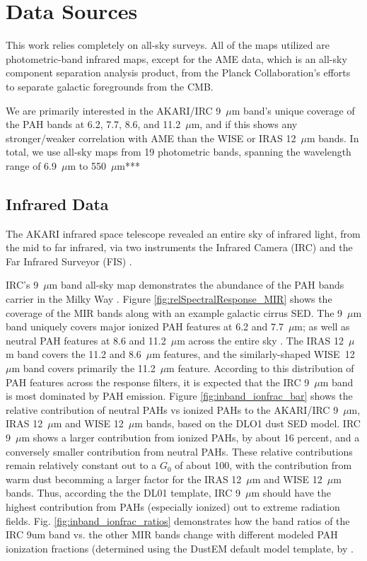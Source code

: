\chapter{Data Sources}
\label{sec:data}

This work relies completely on all-sky surveys. All of the maps utilized are photometric-band infrared maps, except for the AME data, which is an all-sky component separation analysis product, from the Planck Collaboration's efforts to separate galactic foregrounds from the CMB.

We are primarily interested in the AKARI/IRC 9~$\mu$m band's unique coverage of the PAH bands at 6.2, 7.7, 8.6, and 11.2~$\mu$m, and if this shows any stronger/weaker correlation with AME than the WISE or IRAS 12~$\mu$m bands. In total, we use all-sky maps from 19 photometric bands, spanning the wavelength range of 6.9~$\mu$m to 550~$\mu$m***

\section{Infrared Data}

     The AKARI infrared space telescope revealed an entire sky of infrared light, from the mid to far infrared, via two instruments \citep{akari07} the Infrared Camera (IRC)\citep{irc07} and the Far Infrared Surveyor (FIS) \citep{fis07}.

     IRC's 9~$\mu$m band all-sky map demonstrates the abundance of the PAH bands carrier in the Milky Way \citep{ishihara10}. Figure \ref{fig:relSpectralResponse_MIR} shows the coverage of the MIR bands along with an example galactic cirrus SED. The 9~$\mu$m band uniquely covers major ionized PAH features at 6.2 and 7.7~$\mu$m; as well as neutral PAH features at 8.6 and 11.2~$\mu$m across the entire sky \citep{irc07}. The IRAS 12~$\mu$m band covers the 11.2 and 8.6~$\mu$m features, and the similarly-shaped WISE~12~$\mu$m band covers primarily the 11.2~$\mu$m feature. According to this distribution of PAH features across the response filters, it is expected that the IRC 9~$\mu{}$m band is most dominated by PAH emission. Figure \ref{fig:inband_ionfrac_bar} shows the relative contribution of neutral PAHs vs ionized PAHs to the AKARI/IRC 9~$\mu$m, IRAS 12~$\mu$m and WISE 12~$\mu$m bands, based on the DLO1 dust SED model. IRC 9~$\mu$m shows a larger contribution from ionized PAHs, by about 16 percent, and a conversely smaller contribution from neutral PAHs. These relative contributions remain relatively constant out to a $G_{0}$ of about 100, with the contribution from warm dust becomming a larger factor for the IRAS 12~$\mu$m and WISE 12~$\mu$m bands. Thus, according the the DL01 template, IRC 9~$\mu$m should have the highest contribution from PAHs (especially ionized) out to extreme radiation fields. Fig. \ref{fig:inband_ionfrac_ratios} demonstrates how the band ratios of the IRC 9um band vs. the other MIR bands change with different modeled PAH ionization fractions (determined using the DustEM default model template, by \cite{dustem11}.


